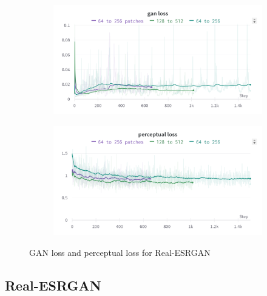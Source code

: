 \begin{figure}[H]
  \centering
  \begin{subfigure}{.5\textwidth}
    \centering
    \includegraphics[width=1\linewidth]{figures/ESRGAN_ganloss.png}
    \label{fig:realesrgan_psnr}
  \end{subfigure}%
  \begin{subfigure}{.5\textwidth}
    \centering
    \includegraphics[width=1\linewidth]{figures/ESRGAN_perceptual.png}
    \label{fig:realesrgan_ssim}
  \end{subfigure}
  \caption{GAN loss and perceptual loss for Real-ESRGAN}
  \label{fig:realesrgan_losses}
\end{figure}

\subsection{Real-ESRGAN}
\label{subsec:training_realesrgan}

